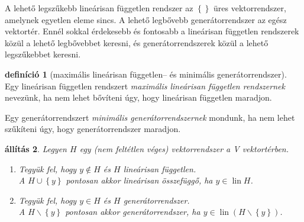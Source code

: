 \documentclass[a4paper, showtrims]{memoir}
\theoremstyle{plain}
\newtheorem{proposition}{állítás}[chapter]
\theoremstyle{remark}
\theoremstyle{definition}
\newtheorem{definition}[proposition]{definíció}
\DeclareMathOperator{\lin}{lin}
\begin{document}
A lehető legszűkebb lineárisan független rendszer az $\left\{  \right\}$ üres vektorrendszer,
amelynek egyetlen eleme sincs.
A lehető legbővebb generátorrendszer az egész vektortér.
Ennél sokkal érdekesebb és fontosabb a lineárisan független rendszerek közül a lehető legbővebbet keresni,
és generátorrendszerek közül a lehető legszűkebbet keresni.
\begin{definition}[maximális lineárisan független-- és minimális generátorrendszer]
	Egy lineárisan független rendszert \emph{maximális lineárisan független rendszernek} nevezünk,
	ha nem lehet bővíteni úgy, hogy lineárisan független maradjon.

	Egy generátorrendszert \emph{minimális generátorrendszernek} mondunk, ha nem lehet szűkíteni úgy,
	hogy generátorrendszer maradjon.
\end{definition}
\begin{proposition}
    Legyen $H$ egy (nem feltétlen véges) vektorrendszer a V vektortérben.
    \begin{enumerate}
        \item Tegyük fel, hogy $y\notin H$ és $H$ lineárisan független.
            \\
            A $H\cup\left\{ y \right\}$ pontosan akkor lineárisan összefüggő, ha $y\in\lin H$.
        \item Tegyük fel, hogy $y\in H$ és $H$ generátorrendszer.
            \\
            A $H\smallsetminus\left\{ y \right\}$ pontosan akkor generátorrendszer, ha $y\in\lin\left( H\smallsetminus \left\{ y \right\} \right)$.
            \qedhere
    \end{enumerate}
\end{proposition}
\end{document}
